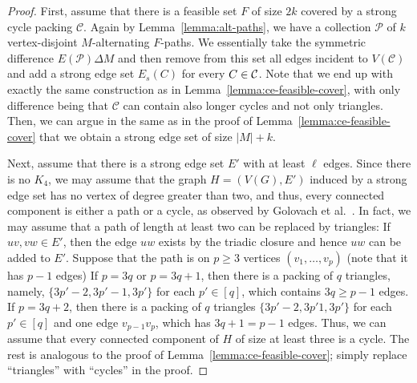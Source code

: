 \begin{proof}
  First, assume that there is a feasible set $F$ of size $2k$ covered by a strong cycle packing $\mathcal{C}$.
  Again by Lemma~\ref{lemma:alt-paths}, we have a collection $\mathcal{P}$ of $k$ vertex-disjoint $M$-alternating $F$-paths.
  We essentially take the symmetric difference $E(\mathcal{P}) \Delta M$ and then remove from this set all edges incident to $V(\mathcal{C})$ and add a strong edge set $E_s(C)$ for every $C \in \mathcal C$. Note that we end up with exactly the same construction as in Lemma~\ref{lemma:ce-feasible-cover}, with only difference being that $\mathcal{C}$ can contain also longer cycles and not only triangles.
  Then, we can argue in the same as in the proof of Lemma~\ref{lemma:ce-feasible-cover} that we obtain a strong edge set of size $|M| + k$.

  Next, assume that there is a strong edge set $E'$ with at least $\ell$ edges.
  Since there is no $K_4$, we may assume that the graph $H = (V(G), E')$ induced by a strong edge set has no vertex of degree greater than two, and thus, every connected component is either a path or a cycle, as observed by Golovach et al.~\cite{GolovachHKLP20}.
  In fact, we may assume that a path of length at least two can be replaced by triangles:
  If $uv, vw \in E'$, then the edge $uw$ exists by the triadic closure and hence $uw$ can be added to $E'$.
  Suppose that the path is on $p \ge 3$ vertices $(v_1, \dots, v_p)$ (note that it has $p - 1$ edges)
  If $p = 3q$ or $p = 3q + 1$, then there is a packing of $q$ triangles, namely, $\{ 3p' - 2, 3p' - 1, 3p' \}$ for each $p' \in [q]$, which contains $3q \ge p - 1$ edges.
  If $p = 3q + 2$, then there is a packing of $q$ triangles $\{ 3p' - 2, 3p' 1, 3p' \}$ for each $p' \in [q]$ and one edge $v_{p - 1} v_p$, which has $3q + 1 = p - 1$ edges.
  Thus, we can assume that every connected component of $H$ of size at least three is a cycle.
  The rest is analogous to the proof of Lemma~\ref{lemma:ce-feasible-cover}; simply replace ``triangles'' with ``cycles'' in the proof.
\end{proof}

